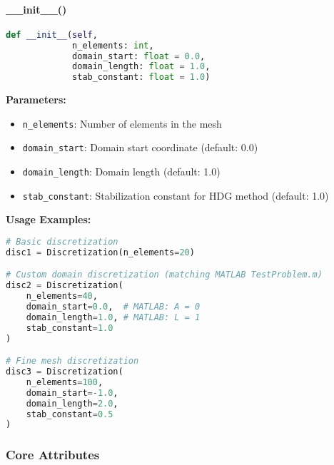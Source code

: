 \paragraph{\_\_init\_\_()}
\begin{lstlisting}[language=Python, caption=Discretization Constructor]
def __init__(self, 
             n_elements: int,
             domain_start: float = 0.0,
             domain_length: float = 1.0,
             stab_constant: float = 1.0)
\end{lstlisting}

\textbf{Parameters:}
\begin{itemize}
    \item \texttt{n\_elements}: Number of elements in the mesh
    \item \texttt{domain\_start}: Domain start coordinate (default: 0.0)
    \item \texttt{domain\_length}: Domain length (default: 1.0)
    \item \texttt{stab\_constant}: Stabilization constant for HDG method (default: 1.0)
\end{itemize}

\textbf{Usage Examples:}
\begin{lstlisting}[language=Python, caption=Discretization Constructor Usage]
# Basic discretization
disc1 = Discretization(n_elements=20)

# Custom domain discretization (matching MATLAB TestProblem.m)
disc2 = Discretization(
    n_elements=40,
    domain_start=0.0,  # MATLAB: A = 0
    domain_length=1.0, # MATLAB: L = 1
    stab_constant=1.0
)

# Fine mesh discretization
disc3 = Discretization(
    n_elements=100,
    domain_start=-1.0,
    domain_length=2.0,
    stab_constant=0.5
)
\end{lstlisting}

\subsubsection{Core Attributes}

